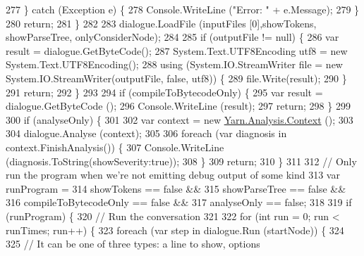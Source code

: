\begin{DoxyCode}
277                 \} \textcolor{keywordflow}{catch} (Exception e) \{
278                     Console.WriteLine (\textcolor{stringliteral}{"Error: "} + e.Message);
279                 \}
280                 \textcolor{keywordflow}{return};
281             \}
282 
283             dialogue.LoadFile (inputFiles [0],showTokens, showParseTree, onlyConsiderNode);
284 
285             \textcolor{keywordflow}{if} (outputFile != null) \{
286                 var result = dialogue.GetByteCode();
287                 System.Text.UTF8Encoding utf8 = \textcolor{keyword}{new} System.Text.UTF8Encoding();
288                 \textcolor{keyword}{using} (System.IO.StreamWriter file = \textcolor{keyword}{new} System.IO.StreamWriter(outputFile, \textcolor{keyword}{false}, utf8)) \{
289                     file.Write(result);
290                 \}
291                 \textcolor{keywordflow}{return};
292             \}
293 
294             \textcolor{keywordflow}{if} (compileToBytecodeOnly) \{
295                 var result = dialogue.GetByteCode ();
296                 Console.WriteLine (result);
297                 \textcolor{keywordflow}{return};
298             \}
299 
300             \textcolor{keywordflow}{if} (analyseOnly) \{
301 
302                 var context = \textcolor{keyword}{new} \hyperlink{a00045}{Yarn.Analysis.Context} ();
303 
304                 dialogue.Analyse (context);
305 
306                 \textcolor{keywordflow}{foreach} (var diagnosis \textcolor{keywordflow}{in} context.FinishAnalysis()) \{
307                     Console.WriteLine (diagnosis.ToString(showSeverity:\textcolor{keyword}{true}));
308                 \}
309                 \textcolor{keywordflow}{return};
310             \}
311 
312             \textcolor{comment}{// Only run the program when we're not emitting debug output of some kind}
313             var runProgram =
314                 showTokens == \textcolor{keyword}{false} &&
315                 showParseTree == \textcolor{keyword}{false} &&
316                 compileToBytecodeOnly == \textcolor{keyword}{false} &&
317                 analyseOnly == \textcolor{keyword}{false};
318 
319             \textcolor{keywordflow}{if} (runProgram) \{
320                 \textcolor{comment}{// Run the conversation}
321 
322                 \textcolor{keywordflow}{for} (\textcolor{keywordtype}{int} run = 0; run < runTimes; run++) \{
323                     \textcolor{keywordflow}{foreach} (var step \textcolor{keywordflow}{in} dialogue.Run (startNode)) \{
324 
325                         \textcolor{comment}{// It can be one of three types: a line to show, options}

\end{DoxyCode}
